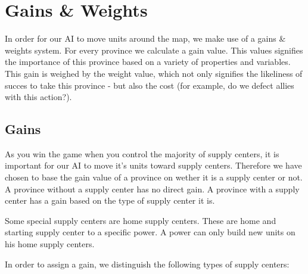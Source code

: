 \documentclass[a4paper]{article} %
\begin{document}
\section{Gains \& Weights}

In order for our AI to move units around the map, we make use of a gains \& weights system. For every province we calculate a gain value. This values signifies the importance of this province based on a variety of properties and variables. This gain is weighed by the weight value, which not only signifies the likeliness of succes to take this province - but also the cost (for example, do we defect allies with this action?).

\subsection{Gains}
As you win the game when you control the majority of supply centers, it is important for our AI to move it's units toward supply centers. Therefore we have chosen to base the gain value of a province on wether it is a supply center or not. A province without a supply center has no direct gain. A province with a supply center has a gain based on the type of supply center it is. 

Some special supply centers are home supply centers. These are home and starting supply center to a specific power. A power can only build new units on his home supply centers.   

In order to assign a gain, we distinguish the following types of supply centers: 
\end{document}
